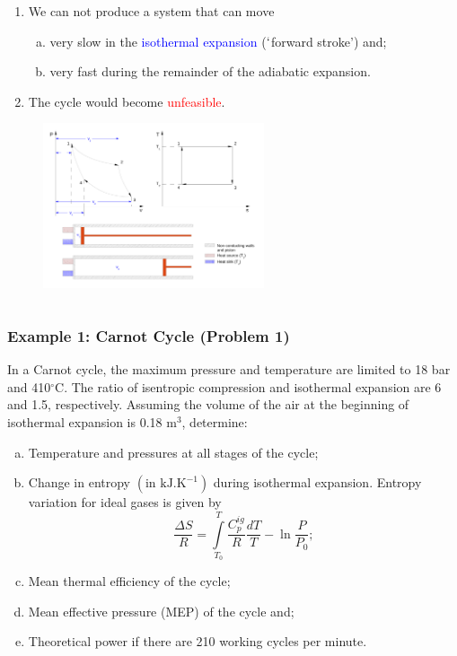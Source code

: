 \documentclass[10pt,compress]{beamer}
\newcommand{\frc}{\displaystyle\frac}
\newcommand{\red}{\textcolor{red}}
\newcommand{\blue}{\textcolor{blue}}
\begin{document}
\begin{frame}
\begin{columns}
\begin{column}[c]{0.55\linewidth}
\begin{enumerate}[(1)]
     \item<4-> We can not produce a system that can move
     \begin{enumerate}[(a)] \scriptsize
        \item<4-> very slow in the \blue{isothermal expansion} ($\lq$forward stroke') and;
        \item<4-> very fast during the remainder of the adiabatic expansion. 
     \end{enumerate}
     \item<5-> The cycle would become \red{unfeasible}.
   \end{enumerate} 
   \begin{figure}%
    \begin{center}
     \includegraphics[width=6.5cm,clip]{./Pics/Carnot_Reciprocating}
    \end{center}
   \end{figure} 
  \end{column}  
 \end{columns} 
\end{frame}

\begin{frame}
 \frametitle{Example 1: Carnot Cycle (Problem 1)}
     In a Carnot cycle, the maximum pressure and temperature are limited to 18 bar and 410$^{\circ}$C. The ratio of isentropic compression and isothermal expansion are 6 and 1.5, respectively. Assuming the volume of the air at the beginning of isothermal expansion is 0.18 m$^{3}$, determine:
       \begin{enumerate}[(a)]
          \item Temperature and pressures at all stages of the cycle; 
          \item Change in entropy $\left(\text{in kJ.K}^{-1}\right)$ during isothermal expansion. Entropy variation for ideal gases is given by
             \begin{displaymath}
                \frc{\Delta S}{R} = \int\limits_{T_{0}}^{T}\frc{C_{p}^{ig}}{R}\frc{d T}{T}-\ln\frc{P}{P_{0}};
             \end{displaymath}
          \item Mean thermal efficiency of the cycle; 
          \item Mean effective pressure (MEP) of the cycle and;
          \item Theoretical power if there are 210 working cycles per minute.
       \end{enumerate}
\end{frame}
\end{document}
